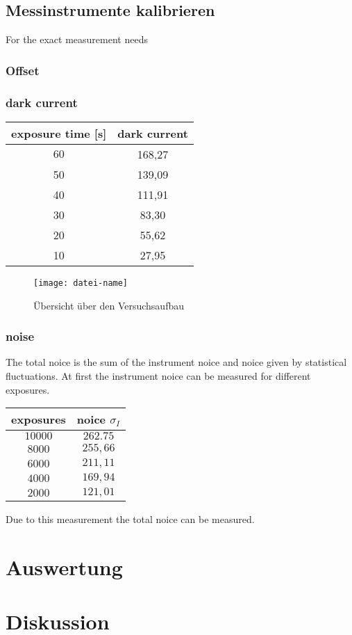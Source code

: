 \documentclass[12pt]{article}
\begin{document}
  \subsection{Messinstrumente kalibrieren}
      For the exact measurement needs
    \subsubsection*{Offset}

    \subsubsection*{dark current}
      \begin{tabular}{c|c}
        exposure time [s] & dark current \\ \hline
        $60$ & 168,27 \\
        50 & 139,09 \\
        40 & 111,91 \\
        30 & 83,30 \\
        20 & 55,62 \\
        10 & 27,95
      \end{tabular}
      \begin{figure}[h]
      	\centering
      	\texttt{[image: datei-name]}
      	\caption{Übersicht über den Versuchsaufbau \label{fig:Versuchsaufbau}}
      \end{figure}
    \subsubsection*{noise}
      \begin{multicols}{2}
        The total noice is the sum of the instrument noice and noice given by
        statistical fluctuations. At first the instrument noice can be measured
        for different exposures.
        \begin{tabular} {c|c}
          exposures & noice $\sigma_I$ \\ \hline
          $10 000$ & $262.75$\\
          $8 000$ & $255,66$\\
          $6 000$ & $211,11$\\
          $4 000$ & $169,94$\\
          $2 000$ & $121,01$
        \end{tabular}
        Due to this measurement the total noice can be measured.

      \end{multicols}

\section{Auswertung}

\section{Diskussion}
\end{document}
